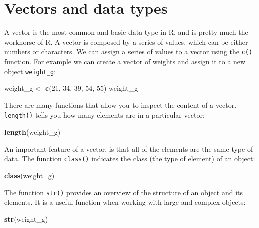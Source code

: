 \documentclass[]{book}
\newenvironment{Shaded}{\begin{snugshade}}{\end{snugshade}}
\newcommand{\KeywordTok}[1]{\textcolor[rgb]{0.13,0.29,0.53}{\textbf{#1}}}
\newcommand{\DecValTok}[1]{\textcolor[rgb]{0.00,0.00,0.81}{#1}}
\newcommand{\StringTok}[1]{\textcolor[rgb]{0.31,0.60,0.02}{#1}}
\newcommand{\NormalTok}[1]{#1}
\theoremstyle{definition}
\theoremstyle{definition}
\theoremstyle{remark}
\begin{document}
\section{Vectors and data types}\label{vectors-and-data-types}

A vector is the most common and basic data type in R, and is pretty much
the workhorse of R. A vector is composed by a series of values, which
can be either numbers or characters. We can assign a series of values to
a vector using the \texttt{c()} function. For example we can create a
vector of weights and assign it to a new object \texttt{weight\_g}:

\begin{Shaded}
\begin{Highlighting}[]
\NormalTok{weight_g <-}\StringTok{ }\KeywordTok{c}\NormalTok{(}\DecValTok{21}\NormalTok{, }\DecValTok{34}\NormalTok{, }\DecValTok{39}\NormalTok{, }\DecValTok{54}\NormalTok{, }\DecValTok{55}\NormalTok{)}
\NormalTok{weight_g}
\end{Highlighting}
\end{Shaded}

There are many functions that allow you to inspect the content of a
vector. \texttt{length()} tells you how many elements are in a
particular vector:

\begin{Shaded}
\begin{Highlighting}[]
\KeywordTok{length}\NormalTok{(weight_g)}
\end{Highlighting}
\end{Shaded}

An important feature of a vector, is that all of the elements are the
same type of data. The function \texttt{class()} indicates the class
(the type of element) of an object:

\begin{Shaded}
\begin{Highlighting}[]
\KeywordTok{class}\NormalTok{(weight_g)}
\end{Highlighting}
\end{Shaded}

The function \texttt{str()} provides an overview of the structure of an
object and its elements. It is a useful function when working with large
and complex objects:

\begin{Shaded}
\begin{Highlighting}[]
\KeywordTok{str}\NormalTok{(weight_g)}
\end{Highlighting}
\end{Shaded}
\end{document}
